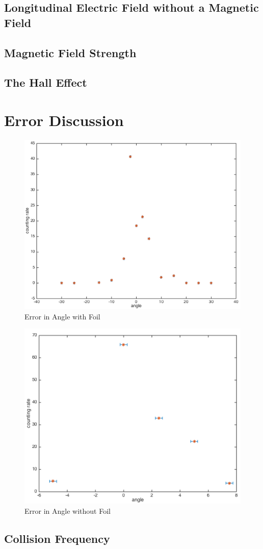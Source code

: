 \subsection{Longitudinal Electric Field without a Magnetic Field} 


\subsection{Magnetic Field Strength}


\subsection{The Hall Effect}


\section{Error Discussion}

\begin{figure}[h]
  \includegraphics[width=5 cm]{errorfoil.png}
  \begin{center}
  \caption{Error in Angle with Foil}
  \label{ErrorFoil}
  \end{center}
\end{figure}

\begin{figure}[h]
  \includegraphics[width=5 cm]{errornofoil.png}
  \begin{center}
  \caption{Error in Angle without Foil}
  \label{ErrorNoFoil}
  \end{center}
\end{figure}

\subsection{Collision Frequency}


